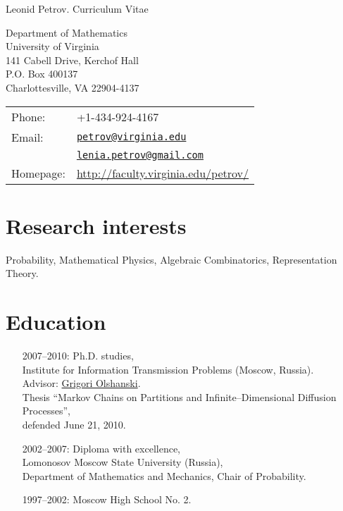 \documentclass[letterpaper,11pt]{article}
\def\name{Leonid Petrov. Curriculum Vitae}
\begin{document}
{\huge \name}


\vspace{0.25in}

\begin{minipage}{0.45\linewidth}
  Department of Mathematics\\
	University of Virginia\\
	141 Cabell Drive, Kerchof Hall\\
	P.O. Box 400137\\
	Charlottesville, VA 22904-4137
\end{minipage}
\begin{minipage}{0.45\linewidth}
  \begin{tabular}{ll}
    Phone: & +1-434-924-4167 \\
    Email: & 
    \href{mailto:petrov@virginia.edu}{\tt petrov@virginia.edu}\\&
    \href{mailto:lenia.petrov@gmail.com}{\tt lenia.petrov@gmail.com}
    \\
    Homepage: & \url{http://faculty.virginia.edu/petrov/} \\
  \end{tabular}
\end{minipage}

\section*{Research interests}

Probability, Mathematical Physics, Algebraic Combinatorics, Representation Theory.

\section*{Education}

\begin{itemize}
  \item[2007--2010:]
  Ph.D. studies,\\Institute for Information Transmission Problems (Moscow, Russia).
  \\
  Advisor: \href{http://www.iitp.ru/en/userpages/88/}{Grigori Olshanski}.\\
  Thesis ``Markov Chains on Partitions and Infinite--Dimensional Diffusion Processes'',\\
  defended
  June 21, 2010.

  \item[2002--2007:]
  Diploma with excellence,\\
  Lomonosov Moscow State University (Russia),\\ Department of Mathematics and Mechanics, Chair of Probability.

  \item 
  [1997--2002:] Moscow High School No. 2.


\end{itemize}
\end{document}
